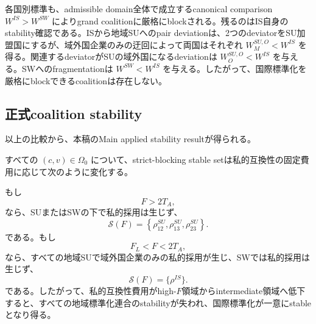 各国別標準も、admissible domain全体で成立するcanonical comparison $W^{IS}>W^{SW}$ によりgrand coalitionに厳格にblockされる。残るのはIS自身のstability確認である。ISから地域SUへのpair deviationは、2つのdeviatorをSU加盟国にするが、域外国企業のみの迂回によって両国はそれぞれ $W_M^{SU,O}<W^{IS}$ を得る。関連するdeviatorがSUの域外国になるdeviationは $W_O^{SU,O}<W^{IS}$ を与える。SWへのfragmentationは $W^{SW}<W^{IS}$ を与える。したがって、国際標準化を厳格にblockできるcoalitionは存在しない。

\subsection{正式coalition stability}
\label{subsec:formal-stability-theorem}

以上の比較から、本稿のMain applied stability resultが得られる。

\begin{theorem}
\label{thm:formal-coalition-stability}
すべての $(c,v)\in\Omega_0$ について、strict-blocking stable setは私的互換性の固定費用に応じて次のように変化する。

もし
\[
    F>2T_A,
\]
なら、SUまたはSWの下で私的採用は生じず、
\begin{equation}
    \boxed{
    \mathcal S(F)
    =\left\{
    \rho_{12}^{SU},
    \rho_{13}^{SU},
    \rho_{23}^{SU}
    \right\}.
    }
    \label{eq:high-f-stable-set}
\end{equation}
である。もし
\[
    F_L<F<2T_A,
\]
なら、すべての地域SUで域外国企業のみの私的採用が生じ、SWでは私的採用は生じず、
\begin{equation}
    \boxed{
    \mathcal S(F)=\{\rho^{IS}\}.
    }
    \label{eq:intermediate-f-stable-set}
\end{equation}
である。したがって、私的互換性費用がhigh-$F$領域からintermediate領域へ低下すると、すべての地域標準化連合のstabilityが失われ、国際標準化が一意にstableとなり得る。
\end{theorem}


